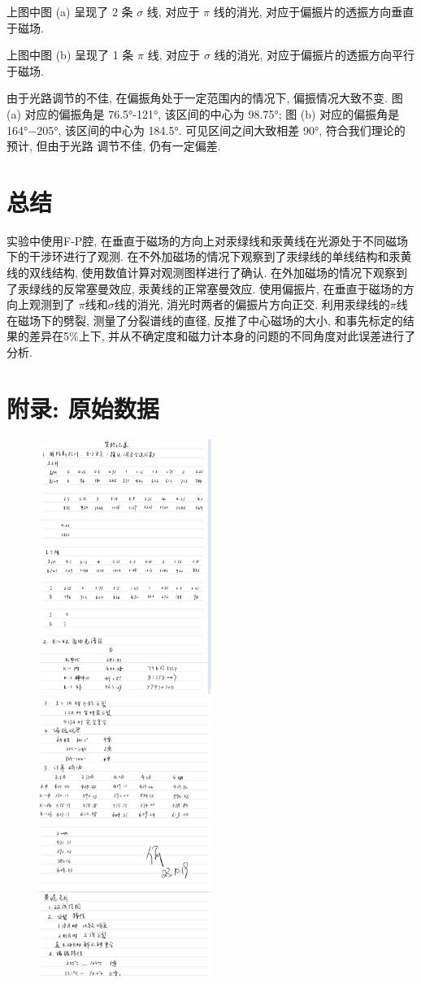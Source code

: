 \documentclass[12pt,a4paper]{article}
\begin{document}
上图中图 (a) 呈现了 2 条 $\sigma$ 线, 对应于 $\pi$ 线的消光, 对应于偏振片的透振方向垂直于磁场. 

上图中图 (b) 呈现了 1 条 $\pi$ 线, 对应于 $\sigma$ 线的消光, 对应于偏振片的透振方向平行
于磁场. 

由于光路调节的不佳, 在偏振角处于一定范围内的情况下, 偏振情况大致不变. 图
(a) 对应的偏振角是 76.5°-121°, 该区间的中心为 98.75°; 图 (b) 对应的偏振角是 164°−205°,
该区间的中心为 184.5°. 可见区间之间大致相差 90°, 符合我们理论的预计, 但由于光路
调节不佳, 仍有一定偏差.
\section{总结}
实验中使用F-P腔, 在垂直于磁场的方向上对汞绿线和汞黄线在光源处于不同磁场下的干涉环进行了观测. 在不外加磁场的情况下观察到了汞绿线的单线结构和汞黄线的双线结构, 使用数值计算对观测图样进行了确认. 在外加磁场的情况下观察到了汞绿线的反常塞曼效应, 汞黄线的正常塞曼效应. 使用偏振片, 在垂直于磁场的方向上观测到了
$\pi$线和$\sigma$线的消光, 消光时两者的偏振片方向正交. 利用汞绿线的$\pi$线在磁场下的劈裂, 测量了分裂谱线的直径, 反推了中心磁场的大小, 和事先标定的结果的差异在5\%上下, 并从不确定度和磁力计本身的问题的不同角度对此误差进行了分析. 

\section{附录: 原始数据}
\begin{figure}[H]
    \centering
    \includegraphics[width=0.5\textwidth]{实验数据1.jpg}
    \includegraphics[width=0.5\textwidth]{实验数据2.jpg}
\end{figure}
\end{document}
